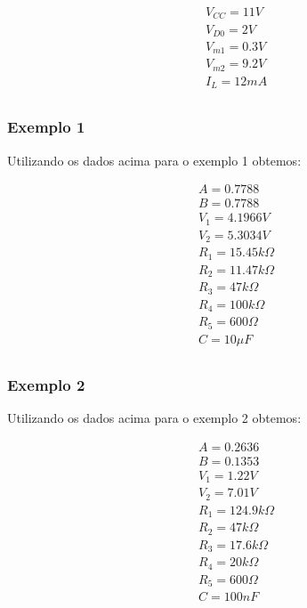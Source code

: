 \begin{equation}
    \begin{aligned}
         & V_{CC} = 11 V  \\
         & V_{D0} = 2 V   \\
         & V_{m1} = 0.3 V \\
         & V_{m2} = 9.2 V \\
         & I_L = 12 mA    \\
    \end{aligned}
\end{equation}

\subsubsection{Exemplo 1}

Utilizando os dados acima para o exemplo 1 obtemos:

\begin{equation}
    \begin{aligned}
         & A = 0.7788             \\
         & B = 0.7788             \\
         & V_1 = 4.1966 V         \\
         & V_2 = 5.3034 V         \\
         & R_1 = 15.45k \varOmega \\
         & R_2 = 11.47k \varOmega \\
         & R_3 = 47k \varOmega    \\
         & R_4 = 100k \varOmega   \\
         & R_5 = 600 \varOmega    \\
         & C = 10 \mu F           \\
    \end{aligned}
\end{equation}

\subsubsection{Exemplo 2}

Utilizando os dados acima para o exemplo 2 obtemos:

\begin{equation}
    \begin{aligned}
         & A = 0.2636             \\
         & B = 0.1353             \\
         & V_1 = 1.22 V           \\
         & V_2 = 7.01 V           \\
         & R_1 = 124.9k \varOmega \\
         & R_2 = 47k \varOmega    \\
         & R_3 = 17.6k \varOmega  \\
         & R_4 = 20k \varOmega    \\
         & R_5 = 600 \varOmega    \\
         & C = 100 nF             \\
    \end{aligned}
\end{equation}